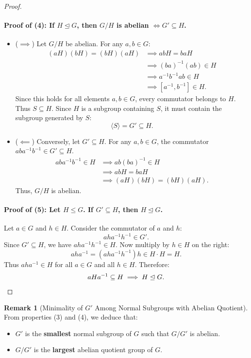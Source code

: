 \documentclass[12pt]{article}
\theoremstyle{definition}
\newtheorem*{remark}{Remark}
\theoremstyle{plain}
\begin{document}
\begin{proof}
\paragraph{Proof of (4): If $H \trianglelefteq G$, then $G/H$ is abelian $\iff G' \subseteq H$.}
\begin{itemize}
    \item ($\implies$) Let $G/H$ be abelian.
    For any $a, b \in G$:
    \begin{align*}
    (a H)(b H) = (b H)(a H) &\implies a b H = b a H \\
    &\implies (b a)^{-1} (a b) \in H \\
    &\implies a^{-1} b^{-1} a b \in H \\
    &\implies [a^{-1}, b^{-1}] \in H.
    \end{align*}
    Since this holds for all elements $a, b \in G$, every commutator belongs to $H$.
    Thus $S \subseteq H$. Since $H$ is a subgroup containing $S$, it must contain the subgroup generated by $S$:
    \[
    \langle S \rangle = G' \subseteq H.
    \]
    
    \item ($\impliedby$) Conversely, let $G' \subseteq H$.
    For any $a, b \in G$, the commutator $a b a^{-1} b^{-1} \in G' \subseteq H$.
    \begin{align*}
    a b a^{-1} b^{-1} \in H &\implies a b (b a)^{-1} \in H \\
    &\implies a b H = b a H \\
    &\implies (a H)(b H) = (b H)(a H).
    \end{align*}
    Thus, $G/H$ is abelian.
\end{itemize}

\paragraph{Proof of (5): Let $H \le G$. If $G' \subseteq H$, then $H \trianglelefteq G$.}
Let $a \in G$ and $h \in H$.
Consider the commutator of $a$ and $h$:
\[
a h a^{-1} h^{-1} \in G'.
\]
Since $G' \subseteq H$, we have $a h a^{-1} h^{-1} \in H$.
Now multiply by $h \in H$ on the right:
\[
a h a^{-1} = (a h a^{-1} h^{-1}) h \in H \cdot H = H.
\]
Thus $a h a^{-1} \in H$ for all $a \in G$ and all $h \in H$.
Therefore:
\[
a H a^{-1} \subseteq H \implies H \trianglelefteq G. \qedhere
\]
\end{proof}

\begin{remark}[Minimality of $G'$ Among Normal Subgroups with Abelian Quotient]
From properties (3) and (4), we deduce that:
\begin{itemize}
    \item $G'$ is the \textbf{smallest} normal subgroup of $G$ such that $G/G'$ is abelian.
    \item $G/G'$ is the \textbf{largest} abelian quotient group of $G$.
\end{itemize}
\end{remark}
\end{document}
